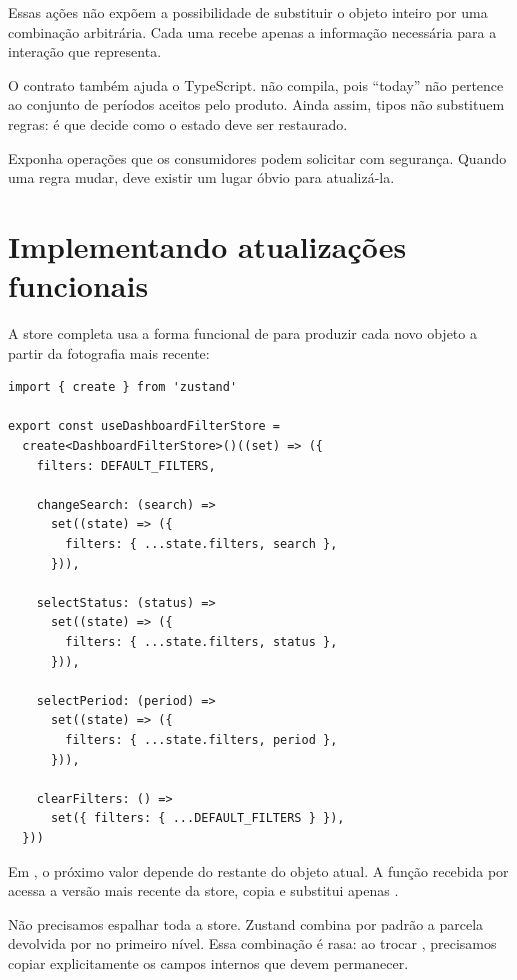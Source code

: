 Essas ações não expõem a possibilidade de substituir o objeto inteiro por uma
combinação arbitrária. Cada uma recebe apenas a informação necessária para a
interação que representa.

O contrato também ajuda o TypeScript.  não
compila, pois ``today'' não pertence ao conjunto de períodos aceitos pelo
produto. Ainda assim, tipos não substituem regras: é  que
decide como o estado deve ser restaurado.

\begin{decisao}
Exponha operações que os consumidores podem solicitar com segurança. Quando uma
regra mudar, deve existir um lugar óbvio para atualizá-la.
\end{decisao}

\section{Implementando atualizações funcionais}

A store completa usa a forma funcional de  para produzir cada novo
objeto a partir da fotografia mais recente:

\begin{lstlisting}[caption={Store dos filtros com ações semânticas.},label={lst:dashboard-filter-store}]
import { create } from 'zustand'

export const useDashboardFilterStore =
  create<DashboardFilterStore>()((set) => ({
    filters: DEFAULT_FILTERS,

    changeSearch: (search) =>
      set((state) => ({
        filters: { ...state.filters, search },
      })),

    selectStatus: (status) =>
      set((state) => ({
        filters: { ...state.filters, status },
      })),

    selectPeriod: (period) =>
      set((state) => ({
        filters: { ...state.filters, period },
      })),

    clearFilters: () =>
      set({ filters: { ...DEFAULT_FILTERS } }),
  }))
\end{lstlisting}

Em , o próximo valor depende do restante do objeto atual.
A função recebida por  acessa a versão mais recente da store, copia
 e substitui apenas .

Não precisamos espalhar toda a store. Zustand combina por padrão a parcela
devolvida por  no primeiro nível. Essa combinação é rasa: ao trocar
, precisamos copiar explicitamente os campos internos que devem
permanecer.

